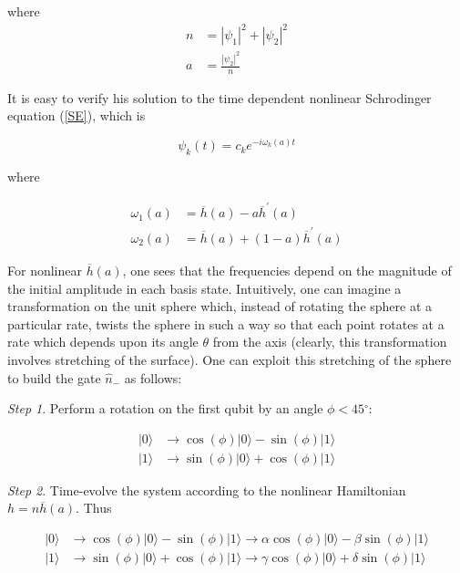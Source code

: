 \documentclass[12pt]{article}
\begin{document}
where
\begin{align}
n  &  =|\psi_{1}|^{2}+|\psi_{2}|^{2}\\
a  &  =\frac{|\psi_{2}|^{2}}{n}%
\end{align}

It is easy to verify his solution to the time dependent nonlinear Schrodinger
equation (\ref{SE}), which is%

\begin{equation}
\psi_{k}(t)=c_{k}e^{-i\omega_{k}(a)t}%
\end{equation}

where%

\begin{align}
\omega_{1}(a)  &  =\overline{h}(a)-a\overline{h}^{\prime}(a)\\
\omega_{2}(a)  &  =\overline{h}(a)+(1-a)\overline{h}^{\prime}(a)
\end{align}

For nonlinear $\overline{h}(a)$, one sees that the frequencies depend on the
magnitude of the initial amplitude in each basis state. Intuitively, one can
imagine a transformation on the unit sphere which, instead of rotating the
sphere at a particular rate, twists the sphere in such a way so that each
point rotates at a rate which depends upon its angle $\theta$ from the axis
(clearly, this transformation involves stretching of the surface). One can
exploit this stretching of the sphere to build the gate $\widehat{n}_{-}$ as follows:

\medskip\noindent
{\it Step 1}. Perform a rotation on the first qubit by an angle $\phi<45{{}^{\circ}}
$:%

\begin{align}
|0\rangle &  \longrightarrow\cos(\phi)|0\rangle-\sin(\phi)|1\rangle\\
|1\rangle &  \longrightarrow\sin(\phi)|0\rangle+\cos(\phi)|1\rangle
\end{align}

\medskip\noindent
{\it Step 2}. Time-evolve the system according to the nonlinear Hamiltonian
$h=n\overline{h}(a)$. Thus%

\begin{align}
|0\rangle &  \longrightarrow\cos(\phi)|0\rangle-\sin(\phi)|1\rangle
\longrightarrow\alpha\cos(\phi)|0\rangle-\beta\sin(\phi)|1\rangle\\
|1\rangle &  \longrightarrow\sin(\phi)|0\rangle+\cos(\phi)|1\rangle
\longrightarrow\gamma\cos(\phi)|0\rangle+\delta\sin(\phi)|1\rangle
\end{align}
\end{document}
